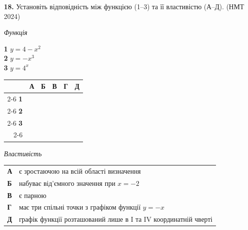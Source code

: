 \documentclass[14pt]{extarticle}
\newcommand{\nmtyear}[1]{\hfill{\small\color{yearcolor}(НМТ #1)}}
\begin{document}
\noindent\textbf{18.} Установіть відповідність між функцією (1--3) та її властивістю (А--Д). \nmtyear{2024}

\vspace{0.3cm}

\noindent
\begin{minipage}[t]{0.40\textwidth}
    \textit{Функція} \par \vspace{0.2cm}
    \textbf{1} \quad $y = 4 - x^2$ \\[0.2cm]
    \textbf{2} \quad $y = -x^3$ \\[0.2cm]
    \textbf{3} \quad $y = 4^x$
    
    \vspace{0.5cm}
    
    \begingroup
    \setlength{\tabcolsep}{4pt}
    \renewcommand{\arraystretch}{1.2}
    \small
    \begin{tabular}{r|c|c|c|c|c|}
         \multicolumn{1}{c}{} & \multicolumn{1}{c}{\textbf{А}} & \multicolumn{1}{c}{\textbf{Б}} & \multicolumn{1}{c}{\textbf{В}} & \multicolumn{1}{c}{\textbf{Г}} & \multicolumn{1}{c}{\textbf{Д}} \\ \cline{2-6}
         \textbf{1} & & & & & \\ \cline{2-6}
         \textbf{2} & & & & & \\ \cline{2-6}
         \textbf{3} & & & & & \\ \cline{2-6}
    \end{tabular}
    \endgroup
\end{minipage}%
\hfill
\begin{minipage}[t]{0.55\textwidth}
    \textit{Властивість} \par \vspace{0.2cm}
    \begin{tabular}{l p{6.5cm}}
    \textbf{А} & є зростаючою на всій області визначення \\
    \textbf{Б} & набуває від’ємного значення при $x = -2$ \\
    \textbf{В} & є парною \\
    \textbf{Г} & має три спільні точки з графіком функції $y = -x$ \\
    \textbf{Д} & графік функції розташований лише в I та IV координатній чверті \\
    \end{tabular}
\end{minipage}

\vspace{0.7cm}
\end{document}
